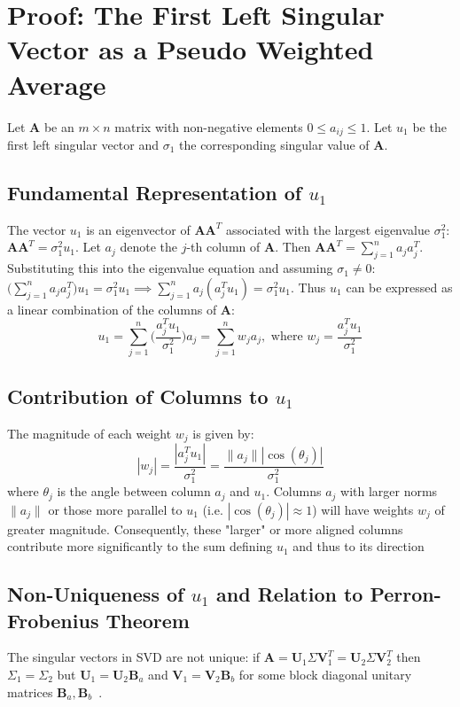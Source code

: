 \appendix

\section{Proof: The First Left Singular Vector as a Pseudo Weighted Average}
Let $\mathbf{A}$ be an $m \times n$ matrix with non-negative elements $0 \leq
a_{ij} \leq 1$. Let $u_1$ be the first left singular vector and $\sigma_1$ the
corresponding singular value of $\mathbf{A}$.

\subsection{Fundamental Representation of $u_1$}
The vector $u_1$ is an eigenvector of $\mathbf{AA}^T$ associated with the
largest eigenvalue $\sigma_1^2$: $\mathbf{AA}^T = \sigma_1^2 u_1$. Let $a_j$
denote the $j$-th column of $\mathbf{A}$. Then $\mathbf{AA}^T = \sum_{j=1}^n a_j
a_j^T$. Substituting this into the eigenvalue equation and assuming $\sigma_1
\neq 0$: $\big( \sum_{j = 1}^n a_j a_j^T\big) u_1 = \sigma_1^2 u_1 \implies
\sum_{j=1}^n a_j (a_j^T u_1) = \sigma_1^2 u_1$. Thus $u_1$ can be expressed as a
linear combination of the columns of $\mathbf{A}$:
\[ u_1 = \sum_{j=1}^n \bigg(\frac{a_j^T u_1}{\sigma_1^2}\bigg) a_j =
\sum_{j=1}^n w_j a_j, \text{  where } w_j = \frac{a_j^T u_1}{\sigma_1^2} \]

\subsection{Contribution of Columns to $u_1$}
The magnitude of each weight $w_j$ is given by:
\[ |w_j| = \frac{|a_j^T u_1|}{\sigma_1^2} = \frac{\parallel a_j\parallel
|\cos(\theta_j)|}{\sigma_1^2}\]
where $\theta_j$ is the angle between column $a_j$ and $u_1$. Columns $a_j$ with
larger norms $\parallel a_j \parallel$ or those more parallel to $u_1$ (i.e.
$|\cos(\theta_j)| \approx 1$) will have weights $w_j$ of greater magnitude.
Consequently, these "larger" or more aligned columns contribute more
significantly to the sum defining $u_1$ and thus to its direction

\subsection{Non-Uniqueness of $u_1$ and Relation to Perron-Frobenius Theorem}
The singular vectors in SVD are not unique: if $\mathbf{A} =
\mathbf{U}_1\Sigma\mathbf{V}_1^T = \mathbf{U}_2\Sigma\mathbf{V}_2^T$ then
$\Sigma_1 = \Sigma_2$ but $\mathbf{U}_1 = \mathbf{U}_2\mathbf{B}_a$ and
$\mathbf{V}_1 = \mathbf{V}_2\mathbf{B}_b$ for some block diagonal unitary
matrices $\mathbf{B}_a, \mathbf{B}_b$~\cite{eftekhari2019moses}.

